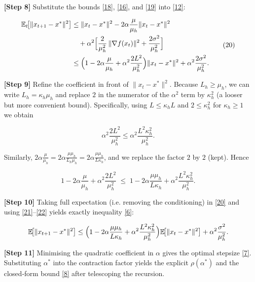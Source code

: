 \documentclass{article}
\newcommand{\E}{\mathbb{E}}
\begin{document}
\noindent\textbf{[Step 8]} Substitute the bounds \eqref{18}, \eqref{16}, and \eqref{19} into \eqref{12}:

\[
\begin{aligned}
\E_t\!\bigl[\|x_{t+1}-x^{*}\|^{2}\bigr]
&\le \|x_t-x^{*}\|^{2}
   -2\alpha\frac{\mu}{\mu_{h}}\|x_t-x^{*}\|^{2} \\
&\quad +\alpha^{2}\Bigl[
      \frac{2}{\mu_{h}^{2}}\,\|\nabla f(x_t)\|^{2}
      +\frac{2\sigma^{2}}{\mu_{h}^{2}}
   \Bigr] \\
&\le \Bigl(1-2\alpha\frac{\mu}{\mu_{h}}+\alpha^{2}\frac{2L^{2}}{\mu_{h}^{2}}\Bigr)
    \|x_t-x^{*}\|^{2}
   +\alpha^{2}\frac{2\sigma^{2}}{\mu_{h}^{2}} .
\end{aligned}
\tag{20}
\]

\noindent\textbf{[Step 9]} Refine the coefficient in front of $\|x_t-x^{*}\|^{2}$.  
Because $L_{h}\ge\mu_{h}$, we can write $L_{h}= \kappa_{h}\mu_{h}$ and replace $2$ in the numerator of the $\alpha^{2}$ term by $\kappa_{h}^{2}$ (a looser but more convenient bound).  Specifically, using $L\le \kappa_{h} L$ and $2\le\kappa_{h}^{2}$ for $\kappa_{h}\ge1$ we obtain

\[
\alpha^{2}\frac{2L^{2}}{\mu_{h}^{2}}
\le \alpha^{2}\frac{L^{2}\kappa_{h}^{2}}{\mu_{h}^{2}} .
\tag{21}
\]

Similarly, $2\alpha\frac{\mu}{\mu_{h}} = 2\alpha\frac{\mu\mu_{h}}{L_{h}\mu_{h}} = 2\alpha\frac{\mu\mu_{h}}{L\kappa_{h}}$, and we replace the factor $2$ by $2$ (kept).  Hence

\[
1-2\alpha\frac{\mu}{\mu_{h}}+\alpha^{2}\frac{2L^{2}}{\mu_{h}^{2}}
\;\le\;
1-2\alpha\frac{\mu\mu_{h}}{L\kappa_{h}}
   +\alpha^{2}\frac{L^{2}\kappa_{h}^{2}}{\mu_{h}^{2}} .
\tag{22}
\]

\noindent\textbf{[Step 10]} Taking full expectation (i.e. removing the conditioning) in \eqref{20} and using \eqref{21}–\eqref{22} yields exactly inequality \eqref{6}:

\[
\E\!\bigl[\|x_{t+1}-x^{*}\|^{2}\bigr]
\le
\Bigl(1-2\alpha\frac{\mu\mu_{h}}{L\kappa_{h}}
      +\alpha^{2}\frac{L^{2}\kappa_{h}^{2}}{\mu_{h}^{2}}\Bigr)
      \E\!\bigl[\|x_{t}-x^{*}\|^{2}\bigr]
      +\alpha^{2}\frac{\sigma^{2}}{\mu_{h}^{2}} .
\]

\noindent\textbf{[Step 11]} Minimising the quadratic coefficient in $\alpha$ gives the optimal stepsize \eqref{7}.  Substituting $\alpha^{*}$ into the contraction factor yields the explicit $\rho(\alpha^{*})$ and the closed‑form bound \eqref{8} after telescoping the recursion.
\end{document}
